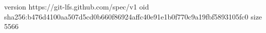 version https://git-lfs.github.com/spec/v1
oid sha256:b476d4100aa507d5cd0b660f86924affc40e91e1b0f770c9a19fbf5893105fc0
size 5566
